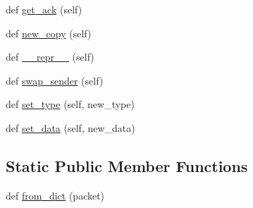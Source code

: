 \begin{DoxyCompactItemize}
\item 
def \hyperlink{classparlai_1_1mturk_1_1core_1_1socket__manager_1_1Packet_a92f4ae50a21d22ab63b041f23d210928}{get\+\_\+ack} (self)
\item 
def \hyperlink{classparlai_1_1mturk_1_1core_1_1socket__manager_1_1Packet_a308912fbfb5d9423d882100db5c79756}{new\+\_\+copy} (self)
\item 
def \hyperlink{classparlai_1_1mturk_1_1core_1_1socket__manager_1_1Packet_a140e38046a95501d5a7798f04b1553bb}{\+\_\+\+\_\+repr\+\_\+\+\_\+} (self)
\item 
def \hyperlink{classparlai_1_1mturk_1_1core_1_1socket__manager_1_1Packet_a369524e6a2a2628fe23d5277fb90a600}{swap\+\_\+sender} (self)
\item 
def \hyperlink{classparlai_1_1mturk_1_1core_1_1socket__manager_1_1Packet_a1269876ae5939e52c10fe4526d50cde4}{set\+\_\+type} (self, new\+\_\+type)
\item 
def \hyperlink{classparlai_1_1mturk_1_1core_1_1socket__manager_1_1Packet_a739506a92dd4482116b64e2e2d4671f2}{set\+\_\+data} (self, new\+\_\+data)
\end{DoxyCompactItemize}
\subsection*{Static Public Member Functions}
\begin{DoxyCompactItemize}
\item 
def \hyperlink{classparlai_1_1mturk_1_1core_1_1socket__manager_1_1Packet_aa186d3b3ba07b6c2eba5e241cbaf92f8}{from\+\_\+dict} (packet)
\end{DoxyCompactItemize}
